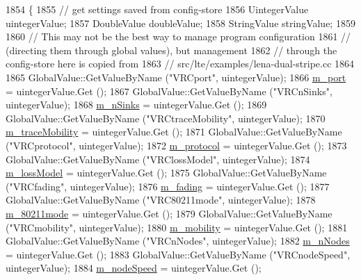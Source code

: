\begin{DoxyCode}
1854 \{
1855   \textcolor{comment}{// get settings saved from config-store}
1856   UintegerValue uintegerValue;
1857   DoubleValue doubleValue;
1858   StringValue stringValue;
1859 
1860   \textcolor{comment}{// This may not be the best way to manage program configuration}
1861   \textcolor{comment}{// (directing them through global values), but management}
1862   \textcolor{comment}{// through the config-store here is copied from}
1863   \textcolor{comment}{// src/lte/examples/lena-dual-stripe.cc}
1864 
1865   GlobalValue::GetValueByName (\textcolor{stringliteral}{"VRCport"}, uintegerValue);
1866   \hyperlink{classVanetRoutingExperiment_ab49e9c29d970f6519fffa45c8285a180}{m\_port} = uintegerValue.Get ();
1867   GlobalValue::GetValueByName (\textcolor{stringliteral}{"VRCnSinks"}, uintegerValue);
1868   \hyperlink{classVanetRoutingExperiment_ab17a92877232a685d02e7980368e6ba5}{m\_nSinks} = uintegerValue.Get ();
1869   GlobalValue::GetValueByName (\textcolor{stringliteral}{"VRCtraceMobility"}, uintegerValue);
1870   \hyperlink{classVanetRoutingExperiment_ad3900da2445a45ec098234888422075f}{m\_traceMobility} = uintegerValue.Get ();
1871   GlobalValue::GetValueByName (\textcolor{stringliteral}{"VRCprotocol"}, uintegerValue);
1872   \hyperlink{classVanetRoutingExperiment_ab1a6336993a742c040c842f9ee25267f}{m\_protocol} = uintegerValue.Get ();
1873   GlobalValue::GetValueByName (\textcolor{stringliteral}{"VRClossModel"}, uintegerValue);
1874   \hyperlink{classVanetRoutingExperiment_a6ca0dcdbcabbd60f246855590b4ee4f5}{m\_lossModel} = uintegerValue.Get ();
1875   GlobalValue::GetValueByName (\textcolor{stringliteral}{"VRCfading"}, uintegerValue);
1876   \hyperlink{classVanetRoutingExperiment_acdcef1359860a9bc93e678e15080544f}{m\_fading} = uintegerValue.Get ();
1877   GlobalValue::GetValueByName (\textcolor{stringliteral}{"VRC80211mode"}, uintegerValue);
1878   \hyperlink{classVanetRoutingExperiment_aae21b34a7fb447a2d7d5bcbcbe8e5fae}{m\_80211mode} = uintegerValue.Get ();
1879   GlobalValue::GetValueByName (\textcolor{stringliteral}{"VRCmobility"}, uintegerValue);
1880   \hyperlink{classVanetRoutingExperiment_a1ab9e6d4a9fcfabb7b6fd820a39f63e3}{m\_mobility} = uintegerValue.Get ();
1881   GlobalValue::GetValueByName (\textcolor{stringliteral}{"VRCnNodes"}, uintegerValue);
1882   \hyperlink{classVanetRoutingExperiment_ac2bf996dc9fe3163f8a720acbf4f6f85}{m\_nNodes} = uintegerValue.Get ();
1883   GlobalValue::GetValueByName (\textcolor{stringliteral}{"VRCnodeSpeed"}, uintegerValue);
1884   \hyperlink{classVanetRoutingExperiment_a01897ca1cb69ddc7caf328989e0b57ba}{m\_nodeSpeed} = uintegerValue.Get ();

\end{DoxyCode}
